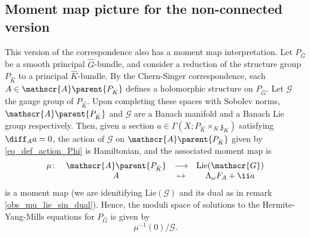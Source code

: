 {\subsection{Moment map picture for the non-connected version}
This version of the correspondence also has a moment map interpretation. Let \(P_{\hat{G}}\) be a smooth principal \(\hat{G}\)-bundle, and consider a reduction of the structure group \(P_{\hat{K}}\) to a principal \(\hat{K}\)-bundle. By the Chern-Singer correspondence, each \(A \in \mathscr{A}\parent{P_{\hat{K}}}\) defines a holomorphic structure on \(P_{\hat{G}}\). Let \(\mathscr{G}\) the gauge group of \(P_{\hat{K}}\). Upon completing these spaces with Sobolev norms, \(\mathscr{A}\parent{P_{\hat{K}}}\) and \(\mathscr{G}\) are a Banach manifold and a Banach Lie group respectively. Then, given a section \(a \in \Gamma(X; P_{\hat{K}} \times_K \mathfrak{z}_K)\) satisfying \(\diff_A a=0\), the action of \(\mathscr{G}\) on \(\mathscr{A}\parent{P_{\hat{K}}}\) given by \eqref{eq_def_action_Phi} is Hamiltonian, and the associated moment map is 
\[
\begin{array}{cccc}
    \mu \colon & \mathscr{A}\parent{P_{\hat{K}}} & \longrightarrow & \mathrm{Lie}(\mathscr{G}) \\
    & A & \mapsto & \Lambda_\omega F_A +\ii a
\end{array}
\]
is a moment map (we are idenitifying \(\mathrm{Lie}(\mathscr{G})\) and its dual as in remark \ref{obs_mu_lie_sin_dual}). Hence, the moduli space of solutions to the Hermite-Yang-Mills equations for \(P_{\hat{G}}\) is given by 
\[
\mu^{-1}(0)/\mathscr{G}.
\]
}


